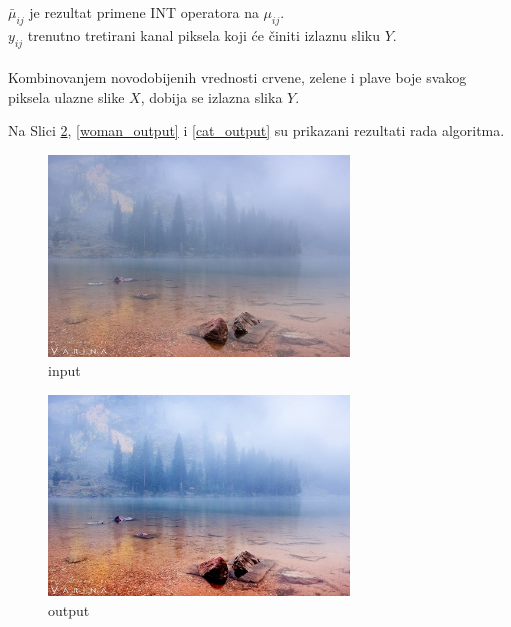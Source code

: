 \documentclass[12pt,a4paper]{article}
\theoremstyle{definition}
\theoremstyle{remark}
\theoremstyle{plain}
\begin{document}
$\bar\mu_{ij}$ je rezultat primene INT operatora na $\mu_{ij}$. \\
$y_{ij}$ trenutno tretirani kanal piksela koji \' ce \v ciniti izlaznu sliku $Y$.\\
\\
Kombinovanjem novodobijenih vrednosti crvene, zelene i plave boje svakog piksela ulazne slike $X$, dobija se izlazna slika $Y$.

\newpage
Na Slici \ref{river_output}, \ref{woman_output} i \ref{cat_output} su prikazani rezultati rada algoritma.

\begin{multicols}{2}
\begin{figure}[H]
\centering
\includegraphics[width=8cm]{images/river.jpg}
  \caption{input}\label{river}
\end{figure}
\columnbreak
\begin{figure}[H]
\centering
\includegraphics[width=8cm]{images/fuzzy_color_1.jpg}
  \caption{output}\label{river_output}
\end{figure}
\end{multicols}
\end{document}
